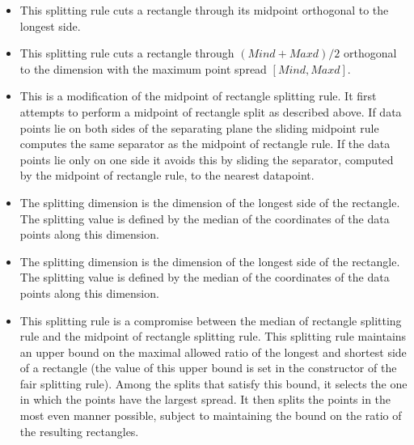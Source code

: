 \begin{itemize}

\item {}

This splitting rule cuts a rectangle through its midpoint orthogonal
to the longest side.

\item {}

This splitting rule cuts a rectangle through $(Mind+Maxd)/2$ orthogonal
to the dimension with the maximum point spread $[Mind,Maxd]$.

\item {}

This is a modification of the midpoint of rectangle splitting rule.
It first attempts to perform a midpoint of rectangle split as
described above. If data points lie on both sides of the separating
plane the sliding midpoint rule computes the same separator as
the midpoint of rectangle rule. If the data points lie only on one
side it avoids this by sliding the separator, computed by
the midpoint of rectangle rule, to the nearest datapoint.

\item {}

The splitting dimension is the dimension of the longest side of the rectangle.
The splitting value is defined by the median of the coordinates of the data points
along this dimension.

\item {}

The splitting dimension is the dimension of the longest side of the rectangle.
The splitting value is defined by the median of the coordinates of the data points
along this dimension.

\item {}

This splitting rule is a compromise between the median of rectangle splitting rule
and the midpoint of rectangle splitting rule. This splitting rule maintains an upper
bound on the maximal allowed ratio of the longest and shortest side of
a rectangle (the value of this upper bound is set in the constructor of the
fair splitting rule). Among the splits that satisfy this bound, it selects
the one in which the points have the largest spread.
It then splits the points in the most even manner possible, subject
to maintaining the bound on the ratio of the resulting rectangles.


\end{itemize}
